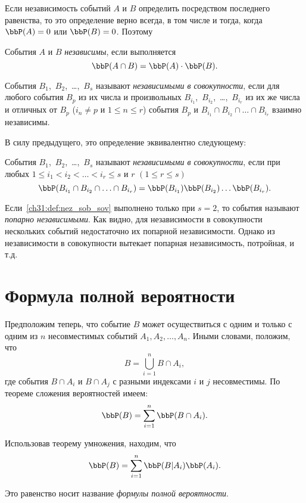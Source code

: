 Если независимость событий $A$ и $B$ определить посредством последнего равенства, то это определение верно всегда, в том числе и тогда, когда $\bbP(A) = 0$ или $\bbP(B) = 0$. Поэтому
\begin{defn}
События $A$ и $B$ \textit{независимы}, если выполняется $$\bbP(A\cap B) = \bbP(A)\cdot \bbP(B).$$
\end{defn}

События $B_1$,~$B_2$,~\dots,~$B_s$ называют \textit{независимыми в совокупности}, если для любого события $B_p$ из их числа и произвольных $B_{i_1}$,~$B_{i_2}$,~\dots,~$B_{i_r}$ из их же числа и отличных от $B_p$  ($i_n \not= p$  и $1 \le n \le r$) события $B_p$ и $B_{i_1}\cap B_{i_2}\cap \dots\cap B_{i_r}$ взаимно независимы.

В силу предыдущего, это определение эквивалентно следующему:
\begin{defn} События $B_1$,~$B_2$,~\dots,~$B_s$ называют \textit{независимыми в совокупности}, если при любых $1 \le i_1 < i_2 < \dots < i_r \le s$ и $r$ $(1 \le r \le s)$
\begin{equation}\label{ch31:def:nez_sob_sov}
\bbP(B_{i_1}\cap B_{i_2}\cap\ldots\cap B_{i_r}) = \bbP(B_{i_1})\bbP(B_{i_2}) \ldots \bbP(B_{i_r}).
\end{equation}
\end{defn}
Если~\eqref{ch31:def:nez_sob_sov} выполнено только при $s=2$, то события называют \textit{попарно независимыми}. Как видно, для независимости в совокупности нескольких событий недостаточно их попарной независимости. Однако из независимости в совокупности вытекает попарная независимость, потройная, и т.д.

\section{Формула полной вероятности}
Предположим теперь, что событие $B$ может осуществиться с одним и только с одним из $n$ несовместимых событий $A_1,A_2, \ldots, A_n$. Иными словами, положим, что
\begin{equation} \label{ch30.2eq5}
B = \bigcup\limits_{i = 1}^{n} B \cap A_i,
\end{equation}
где события $B\cap A_i$ и $B\cap A_j$ с разными индексами $i$ и $j$ несовместимы. По теореме сложения вероятностей имеем:
$$
\bbP(B) = \sum_{i = 1}^{n} \bbP(B\cap A_i).
$$

Использовав теорему умножения, находим, что
$$
\bbP(B) = \sum_{i = 1}^{n} \bbP(B|A_i)\bbP(A_i).
$$

Это равенство носит название \textit{формулы полной вероятности}.

